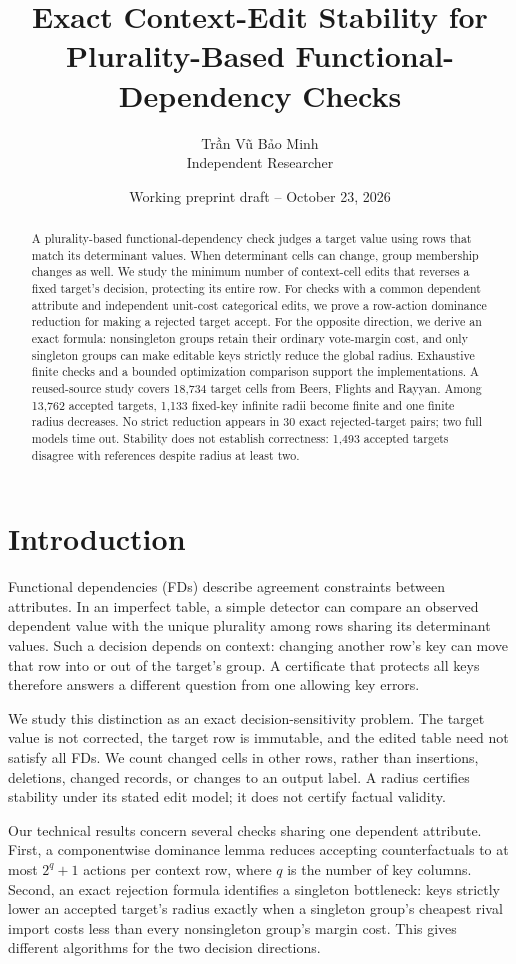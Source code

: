 \documentclass[11pt]{article}
\title{Exact Context-Edit Stability for\\Plurality-Based Functional-Dependency Checks}
\author{Trần Vũ Bảo Minh\\[0.4em]\small Independent Researcher}
\date{Working preprint draft -- October 23, 2026}
\begin{document}
\maketitle
\begin{abstract}
A plurality-based functional-dependency check judges a target value using rows
that match its determinant values. When determinant cells can change, group
membership changes as well. We study the minimum number of context-cell edits
that reverses a fixed target's decision, protecting its entire row. For checks
with a common dependent attribute and independent unit-cost categorical edits,
we prove a row-action dominance reduction for making a rejected target accept.
For the opposite direction, we derive an exact formula: nonsingleton groups
retain their ordinary vote-margin cost, and only singleton groups can make
editable keys strictly reduce the global radius. Exhaustive finite checks and a
bounded optimization comparison support the implementations. A reused-source
study covers 18,734 target cells from Beers, Flights and Rayyan. Among 13,762
accepted targets, 1,133 fixed-key infinite radii become finite and one finite
radius decreases. No strict reduction appears in 30 exact rejected-target
pairs; two full models time out. Stability does not establish correctness:
1,493 accepted targets disagree with references despite radius at least two.
\end{abstract}

\section{Introduction}
Functional dependencies (FDs) describe agreement constraints between attributes.
In an imperfect table, a simple detector can compare an observed dependent
value with the unique plurality among rows sharing its determinant values.
Such a decision depends on context: changing another row's key can move that
row into or out of the target's group. A certificate that protects all keys
therefore answers a different question from one allowing key errors.

We study this distinction as an exact decision-sensitivity problem. The target
value is not corrected, the target row is immutable, and the edited table need
not satisfy all FDs. We count changed cells in other rows, rather than insertions,
deletions, changed records, or changes to an output label. A radius certifies
stability under its stated edit model; it does not certify factual validity.

Our technical results concern several checks sharing one dependent attribute.
First, a componentwise dominance lemma reduces accepting counterfactuals to
at most $2^q+1$ actions per context row, where $q$ is the number of key columns.
Second, an exact rejection formula identifies a singleton bottleneck: keys
strictly lower an accepted target's radius exactly when a singleton group's
cheapest rival import costs less than every nonsingleton group's margin cost.
This gives different algorithms for the two decision directions.
\end{document}
